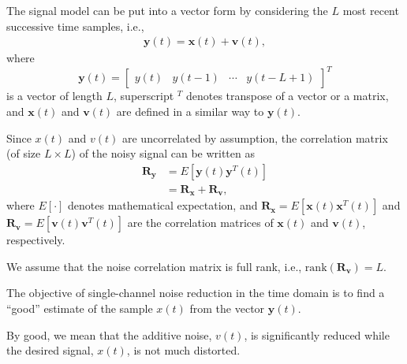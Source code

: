\documentclass[10pt,pdflatex,headrule,landscape]{beamer}
\begin{document}
\begin{frame}[allowframebreaks]

The signal model can be put into a vector form by considering the $L$ most recent successive time samples, i.e.,
\begin{eqnarray}
\label{C2-y(t)-vect}
 \mathbf{y}(t) = \mathbf{x}(t) + \mathbf{v}(t),
\end{eqnarray}
where
\begin{equation}
\label{C2-y(t)-v-def}
 \mathbf{y}(t) = \left[ \begin{array}{cccc} y(t) & y(t-1) & \cdots & y(t-L+1) \end{array} \right]^T
\end{equation}
is a vector of length $L$, superscript $^T$ denotes transpose of a vector or a matrix, and $\mathbf{x}(t)$ and $\mathbf{v}(t)$ are defined in a similar way to $\mathbf{y}(t)$.

Since $x(t)$ and $v(t)$ are uncorrelated by assumption, the correlation matrix (of size $L \times L$) of the noisy signal can be written as
\begin{align}
\label{C2-Ryy}
 \mathbf{R}_{\mathbf{y}} &= E \left[ \mathbf{y}(t) \mathbf{y}^T(t) \right] \\
 &= \mathbf{R}_{\mathbf{x}}+\mathbf{R}_{\mathbf{v}}, \nonumber
\end{align}
where $E [\cdot]$ denotes mathematical expectation, and $\mathbf{R}_{\mathbf{x}}= E \left[ \mathbf{x}(t) \mathbf{x}^T(t) \right]$ and $\mathbf{R}_{\mathbf{v}}= E \left[ \mathbf{v}(t) \mathbf{v}^T(t) \right]$ are the correlation matrices of $\mathbf{x}(t)$ and $\mathbf{v}(t)$, respectively.

We assume that the noise correlation matrix is full rank, i.e., $\mathrm{rank}\left( \mathbf{R}_{\mathbf{v}} \right)=L$.

The objective of single-channel noise reduction in the time domain is to find a ``good'' estimate of the sample $x(t)$ from the vector $\mathbf{y}(t)$.

By good, we mean that the additive noise, $v(t)$, is significantly reduced while the desired signal, $x(t)$, is not much distorted.

\end{frame}
\end{document}
